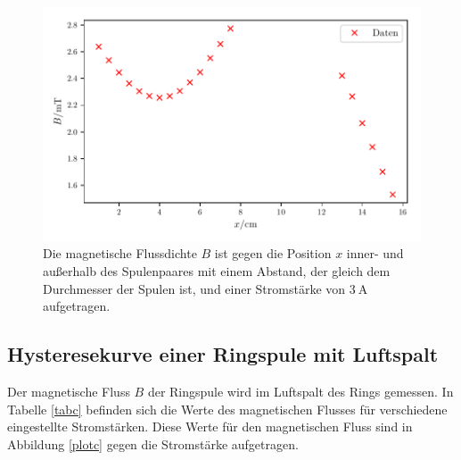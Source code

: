 \begin{figure}
    \centering
    \includegraphics{build/plotb3.pdf}
    \caption{Die magnetische Flussdichte $B$ ist gegen die Position $x$ inner-
    und außerhalb des Spulenpaares mit einem Abstand, der gleich dem Durchmesser
    der Spulen ist, und einer Stromstärke von $\SI{3}{\ampere}$ aufgetragen.}
    \label{plotb3}
\end{figure}

\noindent

\subsection{Hysteresekurve einer Ringspule mit Luftspalt}
Der magnetische Fluss $B$ der Ringspule wird im Luftspalt
des Rings gemessen.
In Tabelle \ref{tabc} befinden sich die Werte des magnetischen
Flusses für verschiedene eingestellte Stromstärken.
Diese Werte für den magnetischen Fluss sind in Abbildung
\ref{plotc} gegen die Stromstärke aufgetragen.


